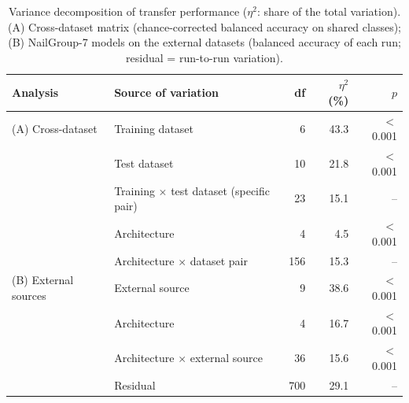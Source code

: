 \begin{table}[!tbp]
\centering
\caption{Variance decomposition of transfer performance ($\eta^2$: share of the total variation). (A) Cross-dataset matrix (chance-corrected balanced accuracy on shared classes); (B) NailGroup-7 models on the external datasets (balanced accuracy of each run; residual = run-to-run variation).}
\label{tab:variance}
\footnotesize
\begin{tabular}{llrrr}
\hline
Analysis & Source of variation & df & $\eta^2$ (\%) & $p$ \\
\hline
(A) Cross-dataset & Training dataset & 6 & 43.3 & $<$0.001 \\
 & Test dataset & 10 & 21.8 & $<$0.001 \\
 & Training $\times$ test dataset (specific pair) & 23 & 15.1 & -- \\
 & Architecture & 4 & 4.5 & $<$0.001 \\
 & Architecture $\times$ dataset pair & 156 & 15.3 & -- \\
\hline
(B) External sources & External source & 9 & 38.6 & $<$0.001 \\
 & Architecture & 4 & 16.7 & $<$0.001 \\
 & Architecture $\times$ external source & 36 & 15.6 & $<$0.001 \\
 & Residual & 700 & 29.1 & -- \\
\hline
\end{tabular}
\end{table}
